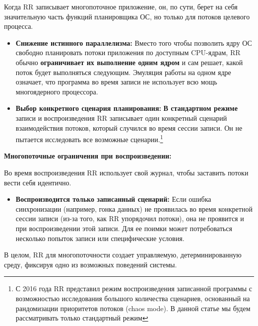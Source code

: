 Когда RR записывает многопоточное приложение, он, по сути, берет на себя
значительную часть функций планировщика ОС, но только для потоков целевого
процесса.
\begin{itemize}

  \item \textbf{Снижение истинного параллелизма:} Вместо того чтобы позволить
  ядру ОС свободно планировать потоки приложения по доступным CPU-ядрам, RR
  обычно \textbf{ограничивает их выполнение одним ядром} и сам решает, какой
  поток будет выполняться следующим. Эмуляция работы на одном ядре означает,
  что программа во время записи не использует всю мощь многоядерного
  процессора.

  \item \textbf{Выбор конкретного сценария планирования:} \textbf{В стандартном
  режиме} записи и воспроизведения RR записывает один конкретный сценарий
  взаимодействия потоков, который случился во время сессии записи. Он не
  пытается исследовать все возможные сценарии.\footnote{С 2016 года RR
  представил режим воспроизведения записанной программы с возможностью
  исследования большого количества сценариев, основанный на рандомизации
  приоритетов потоков (chaos mode). В данной статье мы будем рассматривать
  только стандартный режим}

\end{itemize}

\textbf{Многопоточные ограничения при воспроизведении:}

Во время воспроизведения RR использует свой журнал, чтобы заставить потоки вести себя идентично.

\begin{itemize}

  \item \textbf{Воспроизводится только записанный сценарий:} Если ошибка
  синхронизации (например, гонка данных) не проявилась во время конкретной
  сессии записи (из-за того, как RR упорядочил потоки), она не проявится и при
  воспроизведении этой записи. Для ее поимки может потребоваться несколько
  попыток записи или специфические условия.

\end{itemize}

В целом, RR для многопоточности создает управляемую, детерминированную среду,
фиксируя одно из возможных поведений системы.


